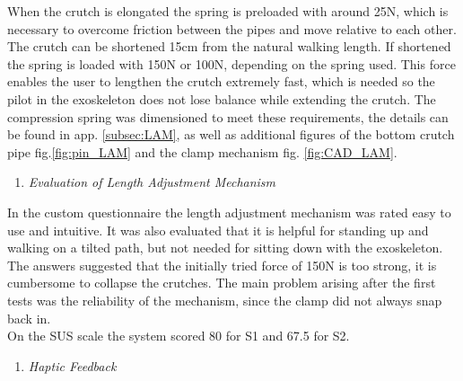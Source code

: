 \documentclass[conference,a4paper]{IEEEtran}
\begin{document}
When the crutch is elongated the spring is preloaded with around 25N, which is necessary to overcome friction between the pipes and move relative to each other. The crutch can be shortened 15cm from the natural walking length. If shortened the spring is loaded with 150N or 100N, depending on the spring used. This force enables the user to lengthen the crutch extremely fast, which is needed so the pilot in the exoskeleton does not lose balance while extending the crutch. The compression spring was dimensioned to meet these requirements, the details can be found in app. \ref{subsec:LAM}, as well as additional figures of the bottom crutch pipe fig.\ref{fig:pin_LAM} and the clamp mechanism fig. \ref{fig:CAD_LAM}. \\

\begin{enumerate}[\textit{2)}]
    \item{\textit{Evaluation of Length Adjustment Mechanism}}
\end{enumerate}
In the custom questionnaire the length adjustment mechanism was rated easy to use and intuitive. It was also evaluated that it is helpful for standing up and walking on a tilted path, but not needed for sitting down with the exoskeleton. The answers suggested that the initially tried force of 150N is too strong, it is cumbersome to collapse the crutches. The main problem arising after the first tests was the reliability of the mechanism, since the clamp did not always snap back in.\\
On the SUS scale the system scored 80 for S1 and 67.5 for S2. \\

\begin{enumerate}
\item{\textit{Haptic Feedback}}
\end{enumerate}
\end{document}
